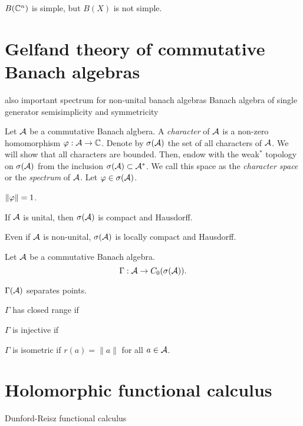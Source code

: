 \documentclass{../note}
\begin{document}
$B(\mathbb{C}^n)$ is simple, but $B(X)$ is not simple.




\section{Gelfand theory of commutative Banach algebras}

also important spectrum for non-unital banach algebras
Banach algebra of single generator
semisimplicity and symmetricity

\begin{prb}
Let $\mathcal{A}$ be a commutative Banach algbera.
A \emph{character} of $\mathcal{A}$ is a non-zero homomorphism $\varphi:\mathcal{A}\to\mathbb{C}$.
Denote by $\sigma(\mathcal{A})$ the set of all characters of $\mathcal{A}$.
We will show that all characters are bounded.
Then, endow with the weak$^*$ topology on $\sigma(\mathcal{A})$ from the inclusion $\sigma(\mathcal{A})\subset\mathcal{A}^*$.
We call this space as the \emph{character space} or the \emph{spectrum} of $\mathcal{A}$.
Let $\varphi\in\sigma(\mathcal{A})$.
\begin{parts}
\item $\|\varphi\|=1$.
\item If $\mathcal{A}$ is unital, then $\sigma(\mathcal{A})$ is compact and Hausdorff.
\item Even if $\mathcal{A}$ is non-unital, $\sigma(\mathcal{A})$ is locally compact and Hausdorff.
\end{parts}
\end{prb}


\begin{prb}
Let $\mathcal{A}$ be a commutative Banach algebra.
\[\Gamma:\mathcal{A}\to C_0(\sigma(\mathcal{A})).\]
\begin{parts}
\item $\Gamma(\mathcal{A})$ separates points.
\item $\Gamma$ has closed range if
\item $\Gamma$ is injective if
\item $\Gamma$ is isometric if $r(a)=\|a\|$ for all $a\in\mathcal{A}$.
\end{parts}
\end{prb}

\section{Holomorphic functional calculus}

Dunford-Reisz functional calculus
\end{document}
